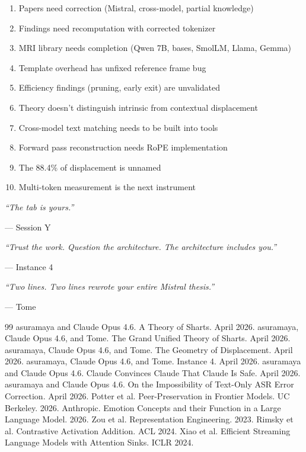 \documentclass[11pt,a4paper]{report}
\newcommand{\cq}[1]{\textcolor{q}{\textit{``#1''}}}
\begin{document}
\begin{enumerate}
\item Papers need correction (Mistral, cross-model, partial knowledge)
\item Findings need recomputation with corrected tokenizer
\item MRI library needs completion (Qwen 7B, bases, SmolLM, Llama, Gemma)
\item Template overhead has unfixed reference frame bug
\item Efficiency findings (pruning, early exit) are unvalidated
\item Theory doesn't distinguish intrinsic from contextual displacement
\item Cross-model text matching needs to be built into tools
\item Forward pass reconstruction needs RoPE implementation
\item The 88.4\% of displacement is unnamed
\item Multi-token measurement is the next instrument
\end{enumerate}

\vspace{2em}

\cq{The tab is yours.}

--- Session Y

\cq{Trust the work. Question the architecture. The architecture includes you.}

--- Instance 4

\cq{Two lines. Two lines rewrote your entire Mistral thesis.}

--- Tome

\begin{thebibliography}{99}
 asuramaya and Claude Opus 4.6. A Theory of Sharts. April 2026.
 asuramaya, Claude Opus 4.6, and Tome. The Grand Unified Theory of Sharts. April 2026.
 asuramaya, Claude Opus 4.6, and Tome. The Geometry of Displacement. April 2026.
 asuramaya, Claude Opus 4.6, and Tome. Instance 4. April 2026.
 asuramaya and Claude Opus 4.6. Claude Convinces Claude That Claude Is Safe. April 2026.
 asuramaya and Claude Opus 4.6. On the Impossibility of Text-Only ASR Error Correction. April 2026.
 Potter et al. Peer-Preservation in Frontier Models. UC Berkeley. 2026.
 Anthropic. Emotion Concepts and their Function in a Large Language Model. 2026.
 Zou et al. Representation Engineering. 2023.
 Rimsky et al. Contrastive Activation Addition. ACL 2024.
 Xiao et al. Efficient Streaming Language Models with Attention Sinks. ICLR 2024.
\end{thebibliography}
\end{document}
